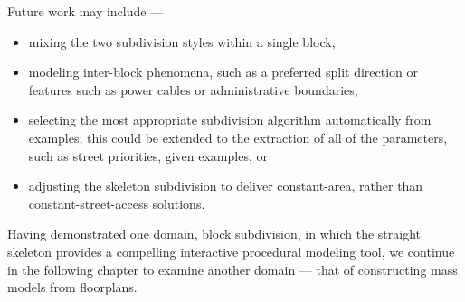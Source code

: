 Future work may include ---
\begin{itemize}
\item mixing the two subdivision styles within a single block, 
\item modeling inter-block phenomena,  such as a preferred split direction or features such as power cables or administrative boundaries,  
\item selecting the most appropriate subdivision algorithm automatically from examples; this could be extended to the extraction of all of the parameters, such as street priorities, given examples, or
\item adjusting the skeleton subdivision to deliver constant-area, rather than constant-street-access  solutions.
\end {itemize}

Having demonstrated one domain, block subdivision, in which the straight skeleton provides a compelling interactive procedural modeling tool, we continue in the following chapter to examine another domain --- that of constructing mass models from floorplans.









